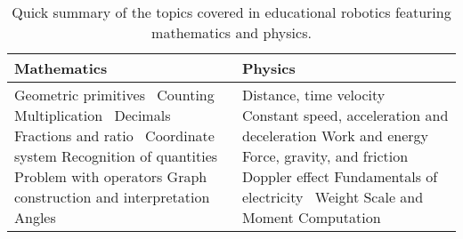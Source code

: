 \documentclass[conference]{IEEEtran}
\begin{document}
\begin{table}[h]
\centering
\caption{Quick summary of the topics covered in educational robotics featuring mathematics and physics.}
\begin{tabular}{p{3.6cm}p{3.6cm}}
\toprule
\textbf{Mathematics} & \textbf{Physics} \\
\midrule
Geometric primitives~\cite{papert1980mindstorms, walker2012user}\newline
Counting~\cite{sullivan2013wheels}\newline
Multiplication~\cite{wei2011joyful}\newline
Decimals~\cite{portsmore2004bringing}\newline
Fractions and ratio~\cite{norton2004using, barker2007robotics, nugent2010impact}\newline
Coordinate system \cite{nugent2010impact, walker2012user}\newline
Recognition of quantities~\cite{iturrizaga2000study}\newline
Problem with operators \cite{iturrizaga2000study}\newline
Graph construction and interpretation~\cite{mitnik2008autonomous, alimisisrobotics}\newline
Angles~\cite{mitnik2008autonomous, utgaard2014investigating}
&
Distance, time velocity~\cite{mitnik2008autonomous, mikropoulos2013educational}\newline
Constant speed, acceleration and deceleration\cite{alimisisrobotics}\newline
Work and energy \cite{saygin2012design}\newline
Force, gravity, and friction~\cite{williams2007acquisition} \newline
Doppler effect \cite{ashdown2012robotics} \newline
Fundamentals of electricity~\cite{tims2011work} \newline
Weight Scale and Moment Computation \cite{Thymioweb}\\
\bottomrule
\end{tabular}
\label{compactEDU}
\end{table}
\end{document}
